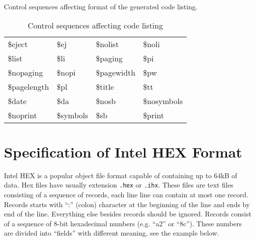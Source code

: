\documentclass[a4paper,twoside,12pt]{book}
\newcommand{\fileextension}[1]{\texttt{#1}}
\newcommand{\mysmallfont}{\fontsize{8pt}{10pt} \selectfont{}}
\begin{document}
		Control sequences affecting format of the generated code listing.
		\begin{table}[h!]
			\centering{}
			\mysmallfont{}
			\caption{Control sequences affecting code listing}
			\begin{tabular}{|llll|}
				\hline
				\$eject		& \$ej		& \$nolist	& \$noli	\\
				\$list		& \$li		& \$paging	& \$pi		\\
				\$nopaging	& \$nopi	& \$pagewidth	& \$pw		\\
				\$pagelength	& \$pl		& \$title	& \$tt		\\
				\$date		& \$da		& \$nosb	& \$nosymbols	\\
				\$noprint	& \$symbols	& \$sb		& \$print	\\
				\hline
			\end{tabular}
		\end{table}

	\clearpage
	\section{Specification of Intel HEX Format}
		Intel HEX is a popular object file format capable of containing up to 64kB of data. Hex files have usually extension \fileextension{.hex} or \fileextension{.ihx}. These files are text files consisting of a sequence of records, each line line can contain at most one record. Records starts with ``:'' (colon) character at the beginning of the line and ends by end of the line. Everything else besides records should be ignored. Records consist of a sequence of 8-bit hexadecimal numbers (e.g. ``a2'' or ``8c''). These numbers are divided into ``fields'' with different meaning, see the example below.
\end{document}
